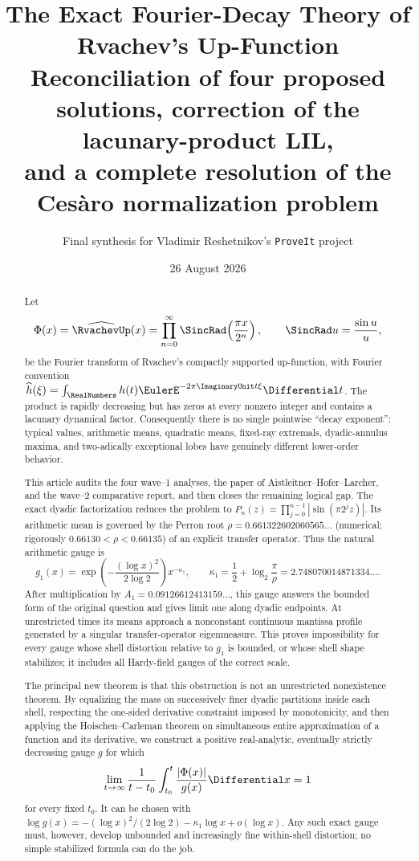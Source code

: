 \documentclass[11pt,oneside]{article}
\title{\bfseries The Exact Fourier-Decay Theory of Rvachev's Up-Function\\[0.35em]
\large Reconciliation of four proposed solutions, correction of the lacunary-product LIL,\\
and a complete resolution of the Ces\`aro normalization problem}
\author{Final synthesis for Vladimir Reshetnikov's \texttt{ProveIt} project}
\date{26 August 2026}
\theoremstyle{definition}
\theoremstyle{remark}
\begin{document}
\maketitle

\begin{abstract}
Let
\[
 \Phi(x)=\widehat{\RvachevUp}(x)
 =\prod_{n=0}^{\infty}\SincRad\!\left(\frac{\pi x}{2^n}\right),
 \qquad \SincRad u=\frac{\sin u}{u},
\]
be the Fourier transform of Rvachev's compactly supported up-function, with
Fourier convention \(\widehat h(\xi)=\int_{\RealNumbers}h(t)\EulerE^{-2\pi\ImaginaryUnit t\xi}\Differential t\).
The product is rapidly decreasing but has zeros at every nonzero integer and
contains a lacunary dynamical factor.  Consequently there is no single
pointwise ``decay exponent'': typical values, arithmetic means, quadratic
means, fixed-ray extremals, dyadic-annulus maxima, and two-adically exceptional
lobes have genuinely different lower-order behavior.

This article audits the four wave--1 analyses, the paper of
Aistleitner--Hofer--Larcher, and the wave--2 comparative report, and then closes
the remaining logical gap.  The exact dyadic factorization reduces the problem
to
\(P_n(z)=\prod_{j=0}^{n-1}|\sin(\pi2^jz)|\).  Its arithmetic mean is governed by
the Perron root
\(\rho=0.661322602060565\ldots\) (numerical; rigorously
\(0.66130<\rho<0.66135\)) of an explicit transfer operator.  Thus the natural
arithmetic gauge is
\[
 g_1(x)=\exp\!\left(-\frac{(\log x)^2}{2\log2}\right)x^{-\kappa_1},
 \qquad
 \kappa_1=\frac12+\log_2\frac{\pi}{\rho}
 =2.748070014871334\ldots .
\]
After multiplication by
\(A_1=0.09126612413159\ldots\), this gauge answers the bounded form of the
original question and gives limit one along dyadic endpoints.  At unrestricted
times its means approach a nonconstant continuous mantissa profile generated by
a singular transfer-operator eigenmeasure.  This proves impossibility for every
gauge whose shell distortion relative to \(g_1\) is bounded, or whose shell
shape stabilizes; it includes all Hardy-field gauges of the correct scale.

The principal new theorem is that this obstruction is not an unrestricted
nonexistence theorem.  By equalizing the mass on successively finer dyadic
partitions inside each shell, respecting the one-sided derivative constraint
imposed by monotonicity, and then applying the Hoischen--Carleman theorem on
simultaneous entire approximation of a function and its derivative, we
construct a positive real-analytic, eventually strictly decreasing gauge
\(g\) for which
\[
 \lim_{t\to\infty}\frac1{t-t_0}\int_{t_0}^t\frac{|\Phi(x)|}{g(x)}\Differential x=1
\]
for every fixed \(t_0\).  It can be chosen with
\(\log g(x)=-(\log x)^2/(2\log2)-\kappa_1\log x+o(\log x)\).
Any such exact gauge must, however, develop unbounded and increasingly fine
within-shell distortion; no simple stabilized formula can do the job.


\end{abstract}
\end{document}
